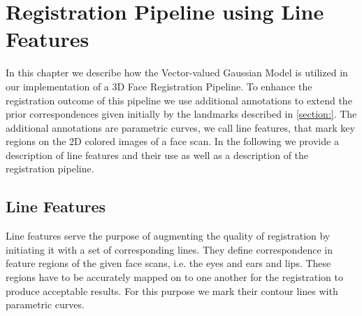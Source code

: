 \chapter{Registration Pipeline using Line Features}
\label{chap:pipelinefeatures}
In this chapter we describe how the Vector-valued Gaussian Model is utilized in our implementation of a 3D Face Registration Pipeline. To enhance the registration outcome of this pipeline we use additional annotations to extend the prior correspondences given initially by the landmarks described in \ref{section:}. The additional annotations are parametric curves, we call line features, that mark key regions on the 2D colored images of a face scan. In the following we provide a description of line features and their use
as well as a description of the registration pipeline. 

\section{Line Features}
Line features serve the purpose of augmenting the quality of registration by initiating it with a set of corresponding lines. They define correspondence in feature regions of the given face scans, i.e. the eyes and ears and lips. These regions have to be accurately mapped on to one another for the registration to produce acceptable results. For this purpose we mark their contour lines with parametric curves. 

